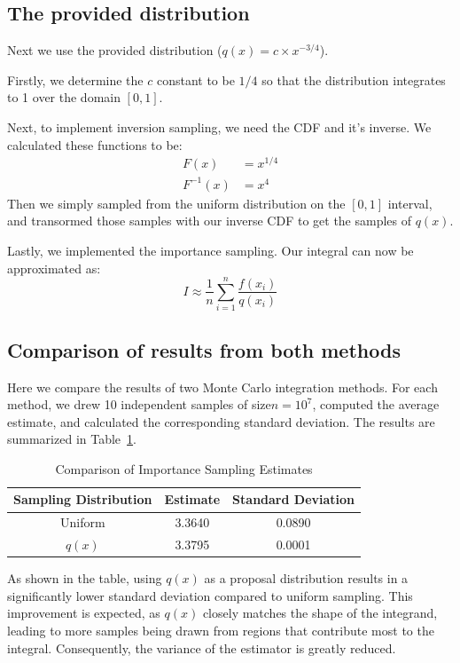 \documentclass[9pt]{IEEEtran}
\begin{document}
 \subsection{The provided distribution}
 Next we use the provided distribution ($q(x) = c \times x^{-3/4}$).
 
 Firstly, we determine the $c$ constant to be $1/4$ so that the distribution
  integrates to 1 over the domain $[0, 1]$. 

 Next, to implement inversion sampling, we need the CDF and it's inverse. 
 We calculated these functions to be: 
\begin{align*}
F(x) &= x^{1/4} \\
F^{-1}(x) &= x^4
\end{align*}
Then we simply sampled from the uniform distribution on the $[0, 1]$ interval, 
and transormed those samples with our inverse CDF to get the samples of $q(x)$.

Lastly, we implemented the importance sampling. Our integral can now be approximated as:
\[
I \approx \frac{1}{n} \sum_{i=1}^{n} \frac{f(x_i)}{ q(x_i)}
\] 


 \subsection{Comparison of results from both methods}
Here we compare the results of two Monte Carlo integration methods. For each method, we drew 10 independent 
samples of size$n = 10^7$, computed the average estimate, and calculated the corresponding
 standard deviation. The results are summarized in Table~\ref{tab:imp}.  

\begin{table}[h]
    \centering
    \begin{tabular}{c|c|c}

    \textbf{Sampling Distribution} & \textbf{Estimate} & \textbf{Standard Deviation} \\
    \hline
    Uniform  & 3.3640 & 0.0890 \\
    $q(x)$ & 3.3795 & 0.0001 \\
    \end{tabular}
    \caption{Comparison of Importance Sampling Estimates}
    \label{tab:imp}
\end{table}

As shown in the table, using $q(x)$ as a proposal distribution results in a significantly 
lower standard deviation compared to uniform sampling. This improvement is expected, as
$q(x)$ closely matches the shape of the integrand, leading to more samples being drawn
 from regions that contribute most to the integral. Consequently, the variance of the 
 estimator is greatly reduced.
\end{document}

